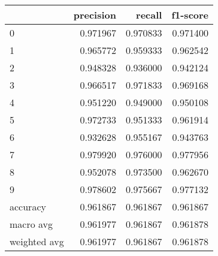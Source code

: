 \begin{tabular}{lrrr}
\toprule
 & precision & recall & f1-score \\
\midrule
0 & 0.971967 & 0.970833 & 0.971400 \\
1 & 0.965772 & 0.959333 & 0.962542 \\
2 & 0.948328 & 0.936000 & 0.942124 \\
3 & 0.966517 & 0.971833 & 0.969168 \\
4 & 0.951220 & 0.949000 & 0.950108 \\
5 & 0.972733 & 0.951333 & 0.961914 \\
6 & 0.932628 & 0.955167 & 0.943763 \\
7 & 0.979920 & 0.976000 & 0.977956 \\
8 & 0.952078 & 0.973500 & 0.962670 \\
9 & 0.978602 & 0.975667 & 0.977132 \\
accuracy & 0.961867 & 0.961867 & 0.961867 \\
macro avg & 0.961977 & 0.961867 & 0.961878 \\
weighted avg & 0.961977 & 0.961867 & 0.961878 \\
\bottomrule
\end{tabular}
